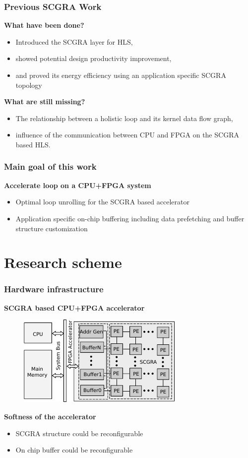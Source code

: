 \documentclass{beamer}
\begin{document}
\begin{frame}[t]
\frametitle{Previous SCGRA Work}
\textbf{What have been done?}
\begin{itemize}
\item Introduced the SCGRA layer for HLS,
\item showed potential design productivity improvement,
\item and proved its energy efficiency using an application specific SCGRA topology
\end{itemize}
\textbf{What are still missing?}
\begin{itemize}
\item The relationship between a holistic loop and its kernel data flow graph,
\item influence of the communication between CPU and FPGA on the SCGRA based HLS.
\end{itemize}
\end{frame}

\begin{frame}[t]
\frametitle{Main goal of this work}
\textbf{Accelerate loop on a CPU+FPGA system}
\begin{itemize}
\item Optimal loop unrolling for the SCGRA based accelerator
\item Application specific on-chip buffering including data prefetching and buffer structure
customization 
\end{itemize}

\end{frame}

\section{Research scheme}
\begin{frame}[t]
\frametitle{Hardware infrastructure} 
\textbf{SCGRA based CPU+FPGA accelerator}
\begin{figure}
\includegraphics[width=0.65\linewidth]{scgra-acceleratorv2}
\end{figure}

\textbf{Softness of the accelerator}
\begin{itemize}
\item SCGRA structure could be reconfigurable
\item On chip buffer could be reconfigurable
\end{itemize}
\end{frame}
\end{document}
